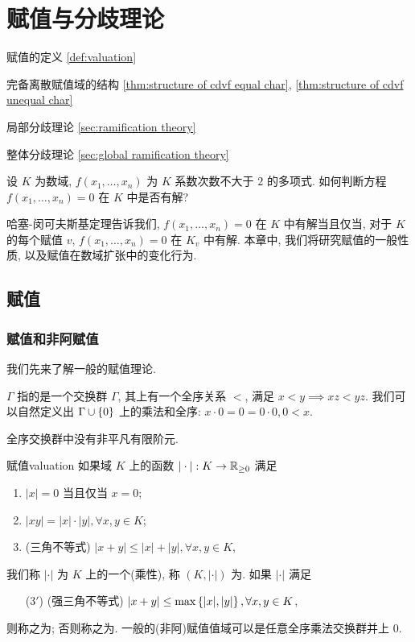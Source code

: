 
\chapter{赋值与分歧理论}
\begin{introduction}
\item 赋值的定义 \ref{def:valuation}
\item 完备离散赋值域的结构 \ref{thm:structure of cdvf equal char}, \ref{thm:structure of cdvf unequal char}
\item 局部分歧理论 \ref{sec:ramification theory}
\item 整体分歧理论 \ref{sec:global ramification theory}
\end{introduction}

\begin{question*}{}{}
设 $K$ 为数域, $f(x_1,\dots,x_n)$ 为 $K$ 系数次数不大于 $2$ 的多项式. 如何判断方程 $f(x_1,\dots,x_n)=0$ 在 $K$ 中是否有解?
\end{question*}

哈塞-闵可夫斯基定理告诉我们, $f(x_1,\dots,x_n)=0$ 在 $K$ 中有解当且仅当, 对于 $K$ 的每个赋值 $v$, $f(x_1,\dots,x_n)=0$ 在 $K_v$ 中有解. 本章中, 我们将研究赋值的一般性质, 以及赋值在数域扩张中的变化行为.

\section{赋值}
\subsection{赋值和非阿赋值}
我们先来了解一般的赋值理论.

\begin{definition}{}{}
 $\Gamma$ 指的是一个交换群 $\Gamma$, 其上有一个全序关系 $<$, 满足 $x<y\implies xz<yz$. 我们可以自然定义出 $\Gamma\cup\left\{0\right\}$ 上的乘法和全序: $x\cdot 0=0=0\cdot 0,0<x$.
\end{definition}

\begin{exercise}
全序交换群中没有非平凡有限阶元.
\end{exercise}

\begin{definition}{赋值}{valuation}
如果域 $K$ 上的函数 $|\cdot|:K\to {\mathbb{R}}_{\ge 0}$ 满足
\begin{enumerate}[(1)]
\item $|x|=0$ 当且仅当 $x=0$;
\item $|xy|=|x|\cdot|y|,\forall x,y\in K$;
\item (三角不等式) $|x+y|\le|x|+|y|,\forall x,y\in K$,
\end{enumerate}
我们称 $|\cdot|$ 为 $K$ 上的一个(乘性), 称 $(K,|\cdot|)$ 为. 如果 $|\cdot|$ 满足
\begin{enumerate}
\item[(3$'$)] (强三角不等式) $|x+y|\le\max\left\{|x|,|y|\right\},\forall x,y\in K$,
\end{enumerate}
则称之为; 否则称之为. 
一般的(非阿)赋值值域可以是任意全序乘法交换群并上 $0$.
\end{definition}

